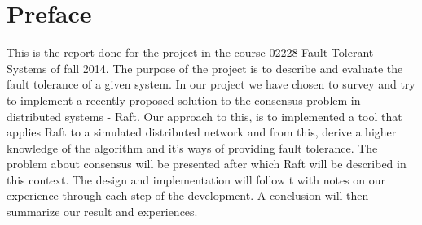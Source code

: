 \thispagestyle{empty}

\section*{Preface} %
\label{sec:preface}

This is the report done for the project in the course 02228 Fault-Tolerant Systems of fall 2014. The purpose of the project is to describe and evaluate the fault tolerance of a given system. In our project we have chosen to survey and try to implement a recently proposed solution to the consensus problem in distributed systems - Raft.
Our approach to this, is to implemented a tool that applies Raft to a simulated distributed network and from this, derive a higher knowledge of the algorithm and it's ways of providing fault tolerance. The problem about consensus will be presented after which Raft will be described in this context. The design and implementation will follow t with notes on our experience through each step of the development.
A conclusion will then summarize our result and experiences.

